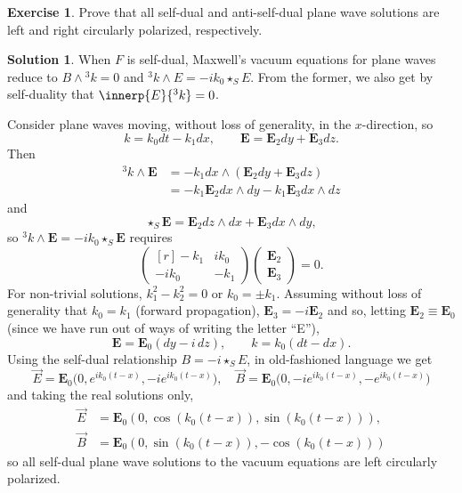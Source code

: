 \documentclass[11pt, a4paper]{report}
\theoremstyle{definition}
\newtheorem{ex}{Exercise}[part]
\newtheorem{sol}{Solution}[part]
\begin{document}
\begin{ex}

Prove that all self-dual and anti-self-dual plane wave solutions are left and right circularly polarized, respectively.

\end{ex}

\begin{sol}

When $F$ is self-dual, Maxwell's vacuum equations for plane waves reduce to $B \wedge {}^3 k = 0$ and $^3 k \wedge E = -ik_0 \star_S E$. From the former, we also get by self-duality that $\innerp{E}{^3 k} = 0$.

Consider plane waves moving, without loss of generality, in the $x$-direction, so
\[
    k = k_0 dt - k_1 dx, \qquad
    \mathbf{E} = \mathbf{E}_2 dy + \mathbf{E}_3 dz.
\]
Then
\begin{align*}
    ^3 k \wedge \mathbf{E} &= -k_1 dx \wedge (\mathbf{E}_2 dy + \mathbf{E}_3 dz) \\
        &= -k_1 \mathbf{E}_2 dx \wedge dy - k_1 \mathbf{E}_3 dx \wedge dz
\end{align*}
and
\[
    \star_S \mathbf{E} = \mathbf{E}_2 dz \wedge dx + \mathbf{E}_3 dx \wedge dy,
\]
so $^3 k \wedge \mathbf{E} = -ik_0 \star_S \mathbf{E}$ requires
\[
    \begin{pmatrix*}[r]
        -k_1  & ik_0 \\
        -ik_0 & -k_1
    \end{pmatrix*}
    \begin{pmatrix}
        \mathbf{E}_2 \\ \mathbf{E}_3
    \end{pmatrix}
    = 0.
\]
For non-trivial solutions, $k_1^2 - k_2^2 = 0$ or $k_0 = \pm k_1$. Assuming without loss of generality that $k_0 = k_1$ (forward propagation), $\mathbf{E}_3 = -i \mathbf{E}_2$ and so, letting $\mathbf{E}_2 \equiv \mathbf{E}_0$ (since we have run out of ways of writing the letter ``E''),
\[
    \mathbf{E} = \mathbf{E}_0 (dy -i \, dz), \qquad
    k = k_0 (dt - dx).
\]
Using the self-dual relationship $B = -i \star_S E$, in old-fashioned language we get
\[
    \vec{E} = \mathbf{E}_0 \bigl( 0, e^{ik_0 (t - x)}, -ie^{ik_0 (t - x)} \bigr), \quad
    \vec{B} = \mathbf{E}_0 \bigl( 0, -ie^{ik_0 (t - x)}, -e^{ik_0 (t - x)} \bigr)
\]
and taking the real solutions only,
\begin{align*}
    \vec{E} &= \mathbf{E}_0 (0, \cos(k_0 (t - x)), \sin(k_0 (t - x))), \\
    \vec{B} &= \mathbf{E}_0 (0, \sin(k_0 (t - x)), -\cos(k_0 (t - x)))
\end{align*}
so all self-dual plane wave solutions to the vacuum equations are left circularly polarized.


\end{sol}
\end{document}

